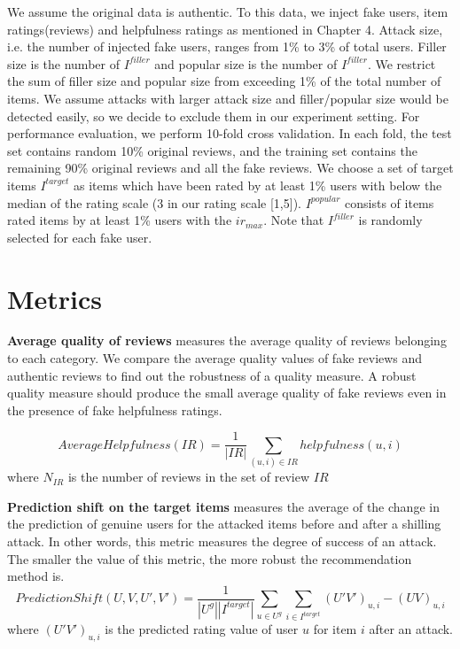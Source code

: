 \documentclass[master,english,final]{kaist-ucs}
\begin{document}
We assume the original data is authentic.
To this data, we inject fake users, item ratings(reviews) and helpfulness ratings as mentioned in Chapter 4.
Attack size, i.e. the number of injected fake users, ranges from 1\% to 3\% of total users.
Filler size is the number of $I^{filler}$ and popular size is the number of $I^{filler}$.
We restrict the sum of filler size and popular size from exceeding 1\% of the total number of items.
We assume attacks with larger attack size and filler/popular size would be detected easily, so we decide to exclude them in our experiment setting.
For performance evaluation, we perform 10-fold cross validation.
In each fold, the test set contains random 10\% original reviews, and the training set contains the remaining 90\% original reviews and all the fake reviews.
We choose a set of target items $I^{target}$ as items which have been rated by at least 1\% users with below the median of the rating scale (3 in our rating scale [1,5]).
$I^{popular}$ consists of items rated items by at least 1\% users with the $ir_{max}$.
Note that $I^{filler}$ is randomly selected for each fake user.


\section{Metrics}
\textbf{Average quality of reviews} measures the average quality of reviews belonging to each category.
We compare the average quality values of fake reviews and authentic reviews to find out the robustness of a quality measure.
A robust quality measure should produce the small average quality of fake reviews even in the presence of fake helpfulness ratings.

\begin{equation}
AverageHelpfulness(IR) = \frac{1}{|IR|} \sum_{ (u,i) \in IR } helpfulness(u,i)
\end{equation}
where $N_{IR}$ is the number of reviews in the set of review $IR$

\textbf{Prediction shift on the target items} measures the average of the change in the prediction of genuine users for the attacked items before and after a shilling attack.
In other words, this metric measures the degree of success of an attack.
The smaller the value of this metric, the more robust the recommendation method is.
\begin{equation}
PredictionShift(U,V,U',V') = \frac{1}{|U^g||I^{target}|} \sum_{u \in U^g} \sum_{i \in I^{target}} (U'V')_{u,i}-(UV)_{u,i}
\end{equation}
where $(U'V')_{u,i}$ is the predicted rating value of user $u$ for item $i$ after an attack.
\end{document}
